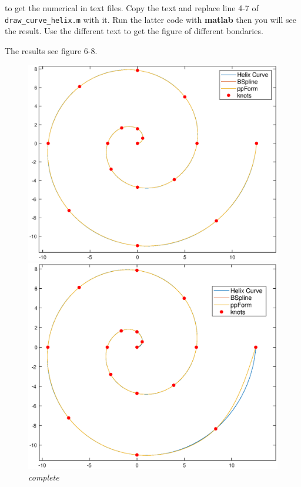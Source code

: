 \documentclass[11pt,en]{elegantpaper}
\begin{document}
to get the numerical in text files. Copy the text and replace line 4-7 of \verb|draw_curve_helix.m| with it. Run the latter code with \textbf{matlab} then you will see the result. Use the different text to get the figure of different bondaries.

The results see figure 6-8.

\begin{figure}[htbp]
    \centering
    \begin{minipage}[t]{0.32\linewidth}
        \centering
        \includegraphics[width=0.9\linewidth]{figure/curve_helix_complete.eps}
        \caption{\textit{complete}}
        \label{fig:side:a}
    \end{minipage}%
    \begin{minipage}[t]{0.32\linewidth}
        \centering
        \includegraphics[width=0.9\linewidth]{figure/curve_helix_natural.eps}

\end{minipage}
\end{figure}
\end{document}
